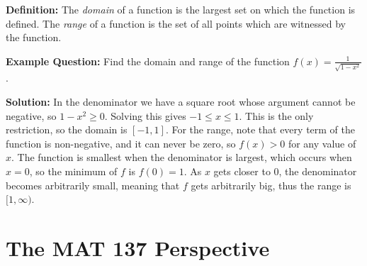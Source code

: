 \documentclass[aspectratio=169]{beamer}
\begin{document}
\begin{frame}[t]

    \textbf{Definition:}
    The \emph{domain} of a function is the largest set on which the function is defined. The \emph{range} of a function is the set of all points which are witnessed by the function.

    \vfill


    \textbf{Example Question:} Find the domain and range of the function $f(x) = \displaystyle \frac1{\sqrt{1-x^2}}$.

    \vfill

    \textbf{Solution:} In the denominator we have a square root whose argument cannot be negative, so $1-x^2\geq 0$. Solving this gives $-1\leq x \leq 1$. This is the only restriction, so the domain is $[-1,1]$. For the range, note that every term of the function is non-negative, and it can never be zero, so $f(x) >0$ for any value of $x$. The function is smallest when the denominator is largest, which occurs when $x=0$, so the minimum of $f$ is $f(0) = 1$. As $x$ gets closer to $0$, the denominator becomes arbitrarily small, meaning that $f$ gets arbitrarily big, thus the range is $[1,\infty)$.


\end{frame}

\section{The MAT 137 Perspective}
\end{document}
